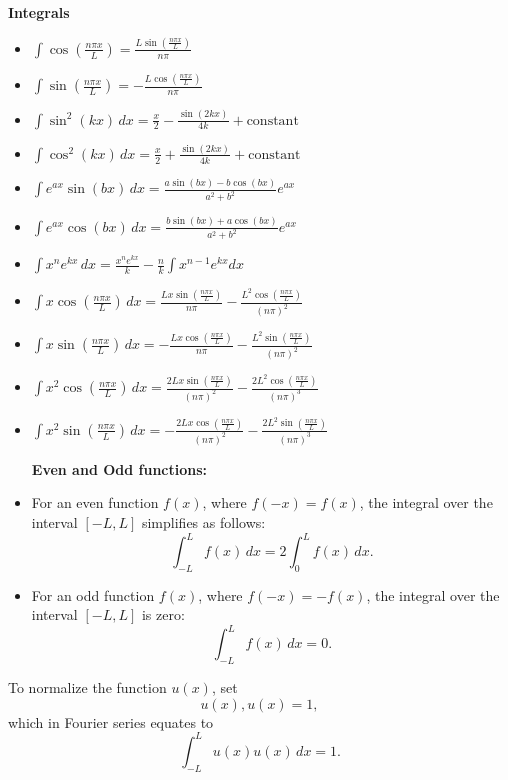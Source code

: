 \documentclass[10pt,landscape]{article}
\begin{document}
\begin{multicols}{2}
\begin{itemize}
    
\end{itemize}

\textbf{Integrals}

\begin{itemize}
    \item $\displaystyle\int \cos(\frac{n\pi x}{L}) = \frac{L\sin(\frac{n\pi x}{L})}{n\pi}$
    \item $\displaystyle\int \sin(\frac{n\pi x}{L}) = -\frac{L\cos(\frac{n\pi x}{L})}{n\pi}$
    \item $\displaystyle\int \sin^2(kx)\, dx = \frac{x}{2} - \frac{\sin(2kx)}{4k} + \text{constant}$
    \item $\displaystyle\int \cos^2(kx)\, dx = \frac{x}{2} + \frac{\sin(2kx)}{4k} + \text{constant}$
    \item $\displaystyle\int e^{ax} \sin(bx)\, dx = \frac{a \sin(bx) - b \cos(bx)}{a^2 + b^2} e^{ax}$
    \item $\displaystyle\int e^{ax} \cos(bx)\, dx = \frac{b \sin(bx) + a \cos(bx)}{a^2 + b^2} e^{ax}$
    \item $\displaystyle\int x^n e^{kx}\, dx = \frac{x^n e^{kx}}{k} - \frac{n}{k} \int x^{n-1} e^{kx} dx$
    \item $\displaystyle\int x \cos\left(\frac{n\pi x}{L}\right) \, dx = \frac{L x \sin\left(\frac{n\pi x}{L}\right)}{n\pi} - \frac{L^2 \cos\left(\frac{n\pi x}{L}\right)}{(n\pi)^2}$
    \item $\displaystyle\int x \sin\left(\frac{n\pi x}{L}\right) \, dx = -\frac{L x \cos\left(\frac{n\pi x}{L}\right)}{n\pi} - \frac{L^2 \sin\left(\frac{n\pi x}{L}\right)}{(n\pi)^2}$
    \item $\displaystyle\int x^2 \cos\left(\frac{n\pi x}{L}\right) \, dx = \frac{2L x \sin\left(\frac{n\pi x}{L}\right)}{(n\pi)^2} - \frac{2L^2 \cos\left(\frac{n\pi x}{L}\right)}{(n\pi)^3}$
    \item $\displaystyle\int x^2 \sin\left(\frac{n\pi x}{L}\right) \, dx = -\frac{2L x \cos\left(\frac{n\pi x}{L}\right)}{(n\pi)^2} - \frac{2L^2 \sin\left(\frac{n\pi x}{L}\right)}{(n\pi)^3}$

\newpage
\textbf{Even and Odd functions:}
    \item For an even function \( f(x) \), where \( f(-x) = f(x) \), the integral over the interval \( [-L, L] \) simplifies as follows:\\
\[
\int_{-L}^L f(x) \, dx = 2 \int_0^L f(x) \, dx.
\]
    \item For an odd function \( f(x) \), where \( f(-x) = -f(x) \), the integral over the interval \( [-L, L] \) is zero:\\
\[
\int_{-L}^L f(x) \, dx = 0.
\]
\end{itemize}
To normalize the function $u(x)$, set \\
$$ u(x), u(x) = 1, $$ 
which in Fourier series equates to \\
$$ \int_{-L}^{L} u(x) u(x) \, dx = 1. $$


\end{multicols}
\end{document}
